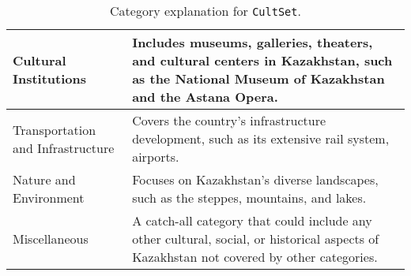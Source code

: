 \begin{table*}
\begin{tabular}{p{} p{}}
    Cultural Institutions & Includes museums, galleries, theaters, and cultural centers in Kazakhstan, such as the National Museum of Kazakhstan and the Astana Opera. \\ \midrule
    Transportation and Infrastructure & Covers the country’s infrastructure development, such as its extensive rail system, airports. \\ \midrule
    Nature and Environment & Focuses on Kazakhstan’s diverse landscapes, such as the steppes, mountains, and lakes. \\ \midrule
    Miscellaneous & A catch-all category that could include any other cultural, social, or historical aspects of Kazakhstan not covered by other categories. \\ 
    \bottomrule
\end{tabular}
    \caption{Category explanation for \texttt{CultSet}.}
    \label{tab:category_exp_culture}
\end{table*}
